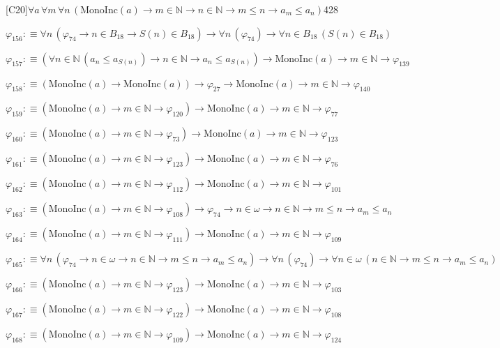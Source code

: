 \begin{fullproof}{[C20]}{$\forall a\,\forall m\,\forall n\,(\mathrm{MonoInc}(a) \to m \in \mathbb{N} \to n \in \mathbb{N} \to m \leq n \to a_{m} \leq a_{n})$}{428}
\begin{abbrevlist}
\item $\varphi_{156} :\equiv \forall n\,(\varphi_{74} \to n \in B_{18} \to S(n) \in B_{18}) \to \forall n\,(\varphi_{74}) \to \forall n \in B_{18}\,(S(n) \in B_{18})$
\item $\varphi_{157} :\equiv (\forall n \in \mathbb{N}\,(a_{n} \leq a_{S(n)}) \to n \in \mathbb{N} \to a_{n} \leq a_{S(n)}) \to \mathrm{MonoInc}(a) \to m \in \mathbb{N} \to \varphi_{139}$
\item $\varphi_{158} :\equiv (\mathrm{MonoInc}(a) \to \mathrm{MonoInc}(a)) \to \varphi_{27} \to \mathrm{MonoInc}(a) \to m \in \mathbb{N} \to \varphi_{140}$
\item $\varphi_{159} :\equiv (\mathrm{MonoInc}(a) \to m \in \mathbb{N} \to \varphi_{120}) \to \mathrm{MonoInc}(a) \to m \in \mathbb{N} \to \varphi_{77}$
\item $\varphi_{160} :\equiv (\mathrm{MonoInc}(a) \to m \in \mathbb{N} \to \varphi_{73}) \to \mathrm{MonoInc}(a) \to m \in \mathbb{N} \to \varphi_{123}$
\item $\varphi_{161} :\equiv (\mathrm{MonoInc}(a) \to m \in \mathbb{N} \to \varphi_{123}) \to \mathrm{MonoInc}(a) \to m \in \mathbb{N} \to \varphi_{76}$
\item $\varphi_{162} :\equiv (\mathrm{MonoInc}(a) \to m \in \mathbb{N} \to \varphi_{112}) \to \mathrm{MonoInc}(a) \to m \in \mathbb{N} \to \varphi_{101}$
\item $\varphi_{163} :\equiv (\mathrm{MonoInc}(a) \to m \in \mathbb{N} \to \varphi_{108}) \to \varphi_{74} \to n \in \omega \to n \in \mathbb{N} \to m \leq n \to a_{m} \leq a_{n}$
\item $\varphi_{164} :\equiv (\mathrm{MonoInc}(a) \to m \in \mathbb{N} \to \varphi_{111}) \to \mathrm{MonoInc}(a) \to m \in \mathbb{N} \to \varphi_{109}$
\item $\varphi_{165} :\equiv \forall n\,(\varphi_{74} \to n \in \omega \to n \in \mathbb{N} \to m \leq n \to a_{m} \leq a_{n}) \to \forall n\,(\varphi_{74}) \to \forall n \in \omega\,(n \in \mathbb{N} \to m \leq n \to a_{m} \leq a_{n})$
\item $\varphi_{166} :\equiv (\mathrm{MonoInc}(a) \to m \in \mathbb{N} \to \varphi_{123}) \to \mathrm{MonoInc}(a) \to m \in \mathbb{N} \to \varphi_{103}$
\item $\varphi_{167} :\equiv (\mathrm{MonoInc}(a) \to m \in \mathbb{N} \to \varphi_{122}) \to \mathrm{MonoInc}(a) \to m \in \mathbb{N} \to \varphi_{108}$
\item $\varphi_{168} :\equiv (\mathrm{MonoInc}(a) \to m \in \mathbb{N} \to \varphi_{109}) \to \mathrm{MonoInc}(a) \to m \in \mathbb{N} \to \varphi_{124}$

\end{abbrevlist}
\end{fullproof}
